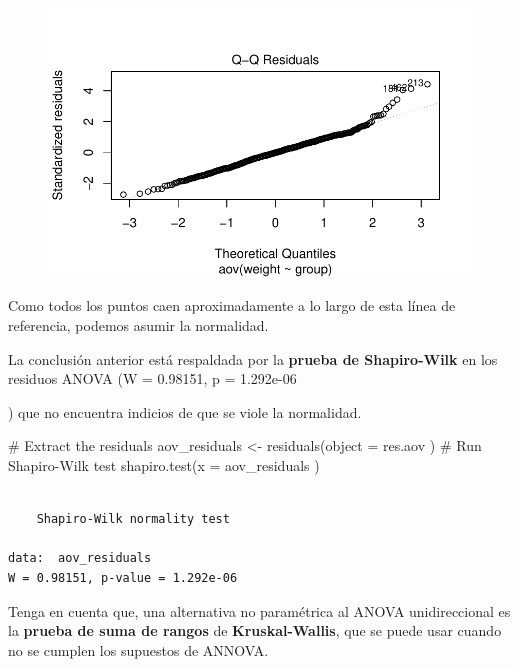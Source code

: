 \documentclass[
  letterpaper,
  DIV=11,
  numbers=noendperiod]{scrartcl}
\newenvironment{Shaded}{\begin{snugshade}}{\end{snugshade}}
\newcommand{\AttributeTok}[1]{\textcolor[rgb]{0.40,0.45,0.13}{#1}}
\newcommand{\CommentTok}[1]{\textcolor[rgb]{0.37,0.37,0.37}{#1}}
\newcommand{\FunctionTok}[1]{\textcolor[rgb]{0.28,0.35,0.67}{#1}}
\newcommand{\NormalTok}[1]{\textcolor[rgb]{0.00,0.23,0.31}{#1}}
\newcommand{\OtherTok}[1]{\textcolor[rgb]{0.00,0.23,0.31}{#1}}
\begin{document}
\begin{figure}[H]

{\centering \includegraphics{ANOVA_files/figure-pdf/unnamed-chunk-14-1.pdf}

}

\end{figure}

Como todos los puntos caen aproximadamente a lo largo de esta línea de
referencia, podemos asumir la normalidad.

La conclusión anterior está respaldada por la \textbf{prueba de
Shapiro-Wilk} en los residuos ANOVA (W = 0.98151, p = 1.292e-06

) que no encuentra indicios de que se viole la normalidad.

\begin{Shaded}
\begin{Highlighting}[]
\CommentTok{\# Extract the residuals}
\NormalTok{aov\_residuals }\OtherTok{\textless{}{-}} \FunctionTok{residuals}\NormalTok{(}\AttributeTok{object =}\NormalTok{ res.aov )}
\CommentTok{\# Run Shapiro{-}Wilk test}
\FunctionTok{shapiro.test}\NormalTok{(}\AttributeTok{x =}\NormalTok{ aov\_residuals )}
\end{Highlighting}
\end{Shaded}

\begin{verbatim}

    Shapiro-Wilk normality test

data:  aov_residuals
W = 0.98151, p-value = 1.292e-06
\end{verbatim}

Tenga en cuenta que, una alternativa no paramétrica al ANOVA
unidireccional es la \textbf{prueba de suma de rangos} de
\textbf{Kruskal-Wallis}, que se puede usar cuando no se cumplen los
supuestos de ANNOVA.
\end{document}
